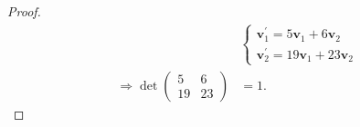 \documentclass[
  coursecode={MTHE 418},
  assignmentname={Homework \homeworknumber},
  studentnumber=20053722,
  name={Bryan Hoang},
  draft,
]{
  ltxanswer%
}
\begin{document}
\begin{questions}
\begin{parts}
      \part{}
      \begin{solution}
        \begin{proof}
          \begin{align*}
                                            &\boxed{\begin{cases}
                                                        \bm{v}_{1}^{\prime} = 5 \bm{v}_{1} + 6 \bm{v}_{2} \\
                                                        \bm{v}_{2}^{\prime} = 19 \bm{v}_{1} + 23 \bm{v}_{2}
                                                      \end{cases} } \\
            \Rightarrow \det\begin{pmatrix}
                              5  & 6  \\
                              19 & 23
                            \end{pmatrix} &= \boxed{1}.
          \end{align*}
        \end{proof}
      \end{solution}


\end{parts}
\end{questions}
\end{document}

